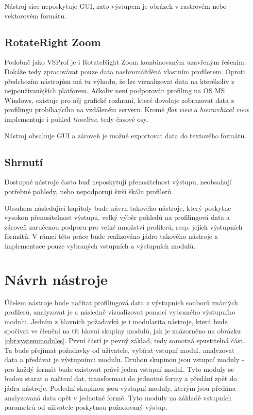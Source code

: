 \documentclass[czech,BP]{thesiskiv}
\begin{document}
Nástroj sice neposkytuje GUI, zato výstupem je obrázek v rastrovém nebo vektorovém formátu.

\section{RotateRight Zoom}

Podobně jako VSProf je i RotateRight Zoom kombinovaným uzavřeným řešením. Dokáže tedy zpracovávat pouze data nashromážděná vlastním profilerem. Oproti předchozím nástrojům má tu výhodu, že lze vizualizovat data na kterékoliv z nejpoužívanějších platforem. Ačkoliv není podporován profiling na OS MS Windows, existuje pro něj grafické rozhraní, které dovoluje zobrazovat data z profilingu probíhajícího na vzdáleném serveru. Kromě \emph{flat view} a \emph{hierarchical view} implementuje i pohled \emph{timeline}, tedy časové osy.

Nástroj obsahuje GUI a zároveň je možné exportovat data do textového formátu.

\section{Shrnutí}

Dostupné nástroje často buď neposkytují přenositelnost výstupu, neobsahují potřebné pohledy, nebo nepodporují širší škálu profilerů.

Obsahem následující kapitoly bude návrh takového nástroje, který poskytne vysokou přenositelnost výstupu, velký výběr pohledů na profilingová data a zároveň zaručenou podporu pro velké množství profilerů, resp. jejich výstupních formátů. V rámci této práce bude realizováno jádro takového nástroje a implementace pouze vybraných vstupních a výstupních modulů.



\newpage

\chapter{Návrh nástroje}

Účelem nástroje bude načítat profilingová data z výstupních souborů známých profilerů, analyzovat je a následně vizualizovat pomocí vybraného výstupního modulu. Jedním z hlavních požadavků je i modularita nástroje, která bude spočívat ve členění na tři hlavní skupiny modulů, jak je znázorněno na obrázku \ref{obr:systemmodules}. První částí je pevný základ, tedy samotná spustitelná část. Ta bude přejímat požadavky od uživatele, vybírat vstupní modul, analyzovat data a předávat je výstupnímu modulu. Druhou skupinou jsou vstupní moduly - pro každý formát bude existovat právě jeden vstupní modul. Tyto moduly se budou starat o načtení dat, transformaci do jednotné formy a předání zpět do jádra nástroje. Poslední skupinou jsou výstupní moduly, kterým jsou předána analyzovaná data opět v jednotné formě. Tyto moduly na základě vstupních parametrů od uživatele poskytnou požadovaný výstup.
\end{document}
